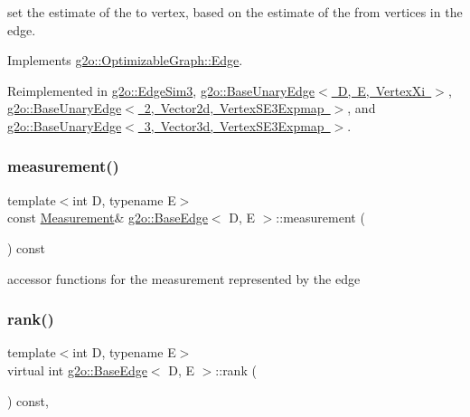 set the estimate of the to vertex, based on the estimate of the from vertices in the edge. 

Implements \mbox{\hyperlink{classg2o_1_1_optimizable_graph_1_1_edge_a9519f8892e97f03daacb44ea50ac7f4e}{g2o\+::\+Optimizable\+Graph\+::\+Edge}}.



Reimplemented in \mbox{\hyperlink{classg2o_1_1_edge_sim3_afac4cc093af6f54adb278c142f33dcca}{g2o\+::\+Edge\+Sim3}}, \mbox{\hyperlink{classg2o_1_1_base_unary_edge_a3d3311901116092cf817b094f6a0b44b}{g2o\+::\+Base\+Unary\+Edge$<$ D, E, Vertex\+Xi $>$}}, \mbox{\hyperlink{classg2o_1_1_base_unary_edge_a3d3311901116092cf817b094f6a0b44b}{g2o\+::\+Base\+Unary\+Edge$<$ 2, Vector2d, Vertex\+S\+E3\+Expmap $>$}}, and \mbox{\hyperlink{classg2o_1_1_base_unary_edge_a3d3311901116092cf817b094f6a0b44b}{g2o\+::\+Base\+Unary\+Edge$<$ 3, Vector3d, Vertex\+S\+E3\+Expmap $>$}}.

\mbox{\label{classg2o_1_1_base_edge_a8e890d43f491afdd035713ff176ddd5c}} 
\subsubsection{\texorpdfstring{measurement()}{measurement()}}
{\footnotesize\ttfamily template$<$int D, typename E$>$ \\
const \mbox{\hyperlink{classg2o_1_1_base_edge_a2c148abba650a20b8c7eed75d3e2211e}{Measurement}}\& \mbox{\hyperlink{classg2o_1_1_base_edge}{g2o\+::\+Base\+Edge}}$<$ D, E $>$\+::measurement (\begin{DoxyParamCaption}{ }\end{DoxyParamCaption}) const\hspace{0.3cm}{\ttfamily [inline]}}



accessor functions for the measurement represented by the edge 

\mbox{\label{classg2o_1_1_base_edge_a6776919120a8eaca8e4b9d0e6b8a421d}} 
\subsubsection{\texorpdfstring{rank()}{rank()}}
{\footnotesize\ttfamily template$<$int D, typename E$>$ \\
virtual int \mbox{\hyperlink{classg2o_1_1_base_edge}{g2o\+::\+Base\+Edge}}$<$ D, E $>$\+::rank (\begin{DoxyParamCaption}{ }\end{DoxyParamCaption}) const\hspace{0.3cm}{\ttfamily [inline]}, {\ttfamily [virtual]}}

